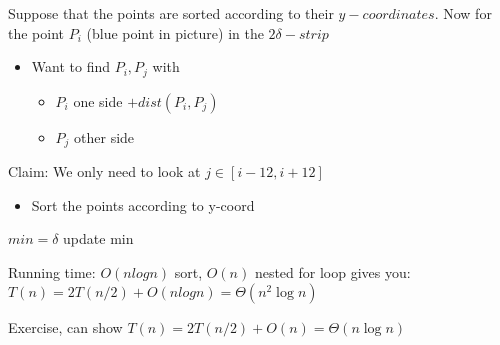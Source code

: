\documentclass[11pt]{article}
\begin{document}
Suppose that the points are sorted according to their \(y-coordinates\). Now for the point \(P_i\) (blue point in picture) in the \(2\delta-strip\)
\begin{itemize}
\item Want to find \(P_i, P_j\) with
\begin{itemize}
\item \(P_i\) one side \(+ dist(P_i,P_j)\)
\item \(P_j\) other side
\end{itemize}
\end{itemize}
Claim: We only need to look at \(j \in [i-12, i+12]\)
\begin{itemize}
\item Sort the points according to y-coord
\end{itemize}
\begin{algorithmic}
\State $min=\delta$
	 update min
	\EndIf
    \EndFor
\EndFor
\end{algorithmic}

Running time: \(O(n log n)\) sort, \(O(n)\) nested for loop gives you: \(T(n)=2T(n/2)+O(n log n) = \Theta(n^2\log n)\)

Exercise, can show \(T(n)=2T(n/2)+O(n)=\Theta(n \log n)\)
\end{document}
